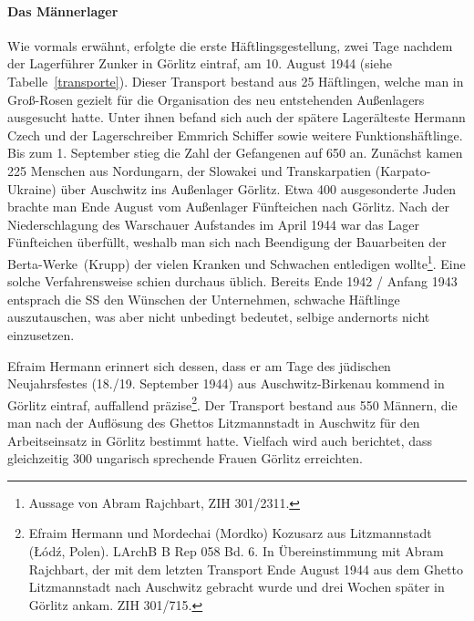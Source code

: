 \documentclass[a4paper,12pt,ngerman,
]{nisebook}
\begin{document}
\paragraph{Das Männerlager}
Wie vormals erwähnt, erfolgte die erste \glqq Häftlingsgestellung\grqq, zwei Tage nachdem der\label{vorauskommando} Lagerführer Zunker in Görlitz eintraf, am 10. August 1944 (siehe Tabelle~\ref{transporte}). Dieser Transport bestand aus 25 Häftlingen, welche man in Groß-Rosen gezielt für die Organisation des neu entstehenden Außenlagers ausgesucht hatte. Unter ihnen befand sich auch der spätere Lagerälteste Hermann Czech und der Lagerschreiber Emmrich Schiffer sowie weitere Funktionshäftlinge. Bis zum 1. September stieg die Zahl der Gefangenen auf 650 an. Zunächst kamen 225 Menschen aus Nordungarn, der Slowakei und Transkarpatien (Karpato-Ukraine) über Auschwitz ins Außenlager Görlitz.
\newline
Etwa 400 ausgesonderte Juden brachte man Ende August vom Außenlager Fünfteichen nach Görlitz. Nach der Niederschlagung des Warschauer Aufstandes im April 1944 war das Lager Fünfteichen überfüllt, weshalb man sich nach Beendigung der Bauarbeiten der \glqq Berta-Werke\grqq~(Krupp) der vielen Kranken und Schwachen entledigen wollte\footnote{Aussage von Abram Rajchbart, ZIH 301/2311.}. Eine solche Verfahrensweise schien durchaus üblich. Bereits Ende 1942 / Anfang 1943 entsprach die SS den Wünschen der Unternehmen, schwache Häftlinge auszutauschen, was aber nicht unbedingt bedeutet, selbige andernorts nicht einzusetzen.\newline



Efraim Hermann erinnert sich dessen, dass er am Tage des jüdischen Neujahrsfestes (18./19. September 1944) aus Auschwitz-Birkenau kommend in Görlitz eintraf, auffallend präzise\footnote{Efraim Hermann und Mordechai (Mordko) Kozusarz aus Litzmannstadt (\L \'od\'z, Polen). LArchB B Rep 058 Bd. 6. In Übereinstimmung mit Abram Rajchbart, der mit dem letzten Transport Ende August 1944 aus dem Ghetto Litzmannstadt nach Auschwitz gebracht wurde und drei Wochen später in Görlitz ankam. ZIH 301/715.}. Der Transport bestand aus 550 Männern, die man nach der Auflösung des Ghettos Litzmannstadt in Auschwitz für den Arbeitseinsatz in Görlitz bestimmt hatte. Vielfach wird auch berichtet, dass gleichzeitig 300 ungarisch sprechende Frauen Görlitz erreichten.\newline
\end{document}
